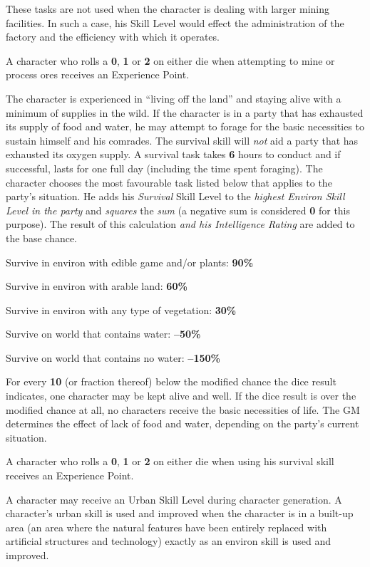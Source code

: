 These tasks are not used when the character is dealing with larger
mining facilities.  In such a case, his Skill Level would effect the
administration of the factory and the efficiency with which it
operates.

A character who rolls a \textbf{0}, \textbf{1} or \textbf{2} on either
die when attempting to mine or process ores receives an Experience
Point.

\label{sec:skill-survival}

The character is experienced in ``living off the land'' and staying
alive with a minimum of supplies in the wild.  If the character is in a
party that has exhausted its supply of food and water, he may attempt
to forage for the basic necessities to sustain himself and his
comrades.  The survival skill will \emph{not} aid a party that has exhausted
its oxygen supply.  A survival task takes \textbf{6} hours to conduct
and if successful, lasts for one full day (including the time spent
foraging).  The character chooses the most favourable task listed below
that applies to the party's situation.  He adds his \emph{Survival}
Skill Level to the \emph{highest Environ Skill Level in the party} and
\emph{squares} the \emph{sum} (a negative sum is considered \textbf{0} for
this purpose).  The result of this calculation \emph{and his
Intelligence Rating} are added to the base chance.

\begin{tasklist}
\item Survive in environ with edible game and/or plants: \textbf{90\%}
\item Survive in environ with arable land: \textbf{60\%}
\item Survive in environ with any type of vegetation: \textbf{30\%}
\item Survive on world that contains water: \textbf{--50\%}
\item Survive on world that contains no water: \textbf{--150\%}
\end{tasklist}

For every \textbf{10} (or fraction thereof) below the modified chance
the dice result indicates, one character may be kept alive and well.
If the dice result is over the modified chance at all, no characters
receive the basic necessities of life.  The GM determines the effect of
lack of food and water, depending on the party's current situation.

A character who rolls a \textbf{0}, \textbf{1} or \textbf{2} on either
die when using his survival skill receives an Experience Point.

\label{sec:skill-urban}

A character may receive an Urban Skill Level during character
generation.  A character's urban skill is used and improved when the
character is in a built-up area (an area where the natural features
have been entirely replaced with artificial structures and technology)
exactly as an environ skill is used and improved.

